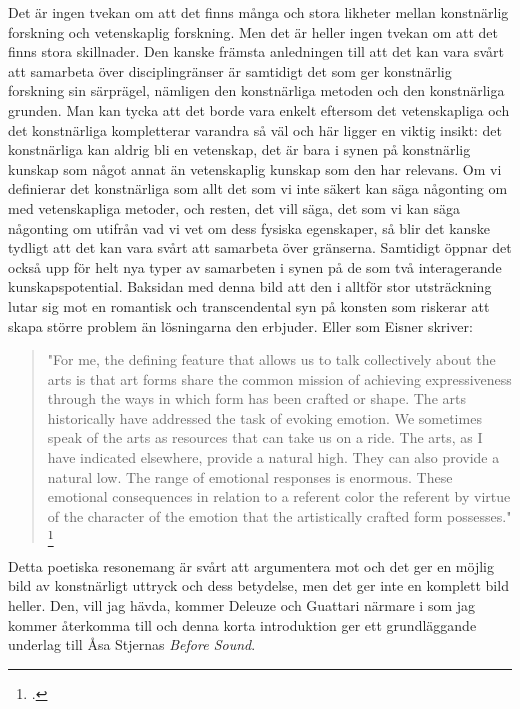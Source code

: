 \documentclass[11pt]{article}
\begin{document}
Det är ingen tvekan om att det finns många och stora likheter mellan
konstnärlig forskning och vetenskaplig forskning. Men det är heller
ingen tvekan om att det finns stora skillnader. Den kanske främsta
anledningen till att det kan vara svårt att samarbeta över
disciplingränser är samtidigt det som ger konstnärlig forskning sin
särprägel, nämligen den konstnärliga metoden och den konstnärliga
grunden. Man kan tycka att det borde vara enkelt eftersom det
vetenskapliga och det konstnärliga kompletterar varandra så väl och
här ligger en viktig insikt: det konstnärliga kan aldrig bli en
vetenskap, det är bara i synen på konstnärlig kunskap som något annat
än vetenskaplig kunskap som den har relevans. Om vi definierar det
konstnärliga som allt det som vi inte säkert kan säga någonting om med
vetenskapliga metoder, och resten, det vill säga, det som vi kan säga
någonting om utifrån vad vi vet om dess fysiska egenskaper, så blir
det kanske tydligt att det kan vara svårt att samarbeta över
gränserna. Samtidigt öppnar det också upp för helt nya typer av
samarbeten i synen på de som två interagerande
kunskapspotential. Baksidan med denna bild att den i
alltför stor utsträckning lutar sig mot en romantisk och
transcendental syn på konsten som riskerar att skapa större problem än
lösningarna den erbjuder. Eller som Eisner skriver:

\begin{quote}
  "For me, the defining feature that allows us to talk collectively
  about the arts is that art forms share the common mission of
  achieving expressiveness through the ways in which form has been
  crafted or shape. The arts historically have addressed the task of
  evoking emotion. We sometimes speak of the arts as resources that
  can take us on a ride. The arts, as I have indicated elsewhere,
  provide a natural high. They can also provide a natural low. The
  range of emotional responses is enormous. These emotional
  consequences in relation to a referent color the referent by virtue
  of the character of the emotion that the artistically crafted form
  possesses." \footcite{Eisner2008}
\end{quote}
Detta poetiska resonemang är svårt att argumentera mot och det ger en
möjlig bild av konstnärligt uttryck och dess betydelse, men det ger
inte en komplett bild heller. Den, vill jag hävda, kommer Deleuze och
Guattari närmare i  som jag kommer återkomma
till och denna korta introduktion ger ett grundläggande underlag till
Åsa Stjernas \emph{Before Sound}.
\end{document}
